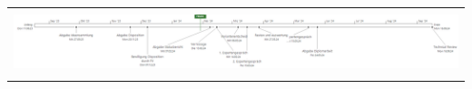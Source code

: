 \begin{landscape}
\begin{table}[]
{\begin{tabular}{lllllll}
\multicolumn{7}{l}{}                                                                                                                                                                                                                                                                                                                                                                                                                                                                                                                                                                                                                                                                                                                                                                                                                                            \\
\multicolumn{7}{c}{\includegraphics[width=2\linewidth]{source/status_report/main/init_timeline}}                                                                                                                                                                                                                                                                                                                                                                                                                                                                                                                                                                                                                                                                                                                                                                                                                                            \\
\multicolumn{7}{l}{}                                                                                                                                                                                                                                                                                                                                                                                                                                                                                                                                                                                                                                                                                                                                                                                                                                            \\

\end{tabular}}
\end{table}
\end{landscape}

